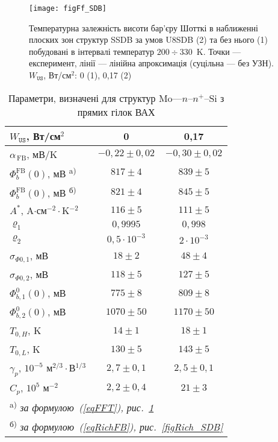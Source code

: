 \begin{figure}
\center
\texttt{[image: figFf\_SDB]}
\caption{\label{figFf_SDB}
Температурна залежність висоти бар'єру Шотткі в наближенні плоских зон
структур SSDB за умов U8SDB (2) та без нього (1) побудовані в інтервалі
температур $200\div330$~K.
Точки --- експеримент, лінії --- лінійна апроксимація (суцільна --- без УЗН).
$W_\mathtt{US}$,  Вт/см$^2$: 0 (1), 0,17 (2)
}%
\end{figure}


\begin{table}
\caption{Параметри, визначені для структур Mo---$n$--$n^+$--Si з прямих гілок ВАХ}
\label{tabSDBPar}
\centering
\begin{tabular}{|l|c|c|}
\hline
$W_\mathtt{US}$,  Вт/см$^2$ &0&0,17\\\hline
\hline
$\alpha_\mathrm{\,FB}$, мВ/K &$-0,22\pm0,02$&$-0,30\pm0,02$\\\hline
$\Phi_{b}^\mathrm{FB}(0)$, мВ \textsuperscript{ a)} &$817\pm4$ & $839\pm5$\\\hline
$\Phi_{b}^\mathrm{FB}(0)$, мВ \textsuperscript{ б)} &$821\pm4$ & $845\pm5$\\\hline
$A^*$, A$\cdot$см$^{-2}\cdot$K$^{-2}$ &$116\pm5$ & $111\pm5$\\\hline
$\varrho_1$ &$0,9995$ & $0,998$\\\hline
$\varrho_2$ &$0,5\cdot10^{-3}$ & $2\cdot10^{-3}$\\\hline
$\sigma_{\Phi0,1}$, мВ&$18\pm2$ & $48\pm4$\\\hline
$\sigma_{\Phi0,2}$, мВ&$118\pm5$ & $127\pm5$\\\hline
$\Phi_{b,1}^0(0)$, мВ&$775\pm8$ & $809\pm8$\\\hline
$\Phi_{b,2}^0(0)$, мВ&$1070\pm50$ & $1170\pm50$\\\hline
$T_{0,H}$, K&$14\pm1$&$18\pm1$\\\hline
$T_{0,L}$, K&$130\pm5$&$143\pm5$\\\hline
$\gamma_p$, $10^{-5}$ м$^{2/3}\cdot$В$^{1/3}$&$2,7\pm0,1$&$2,5\pm0,1$\\\hline
$C_p$, $10^{5}$ м$^{-2}$&$2,2\pm0,4$&$21\pm3$\\ \hline
\multicolumn{3}{l}{\textsuperscript{ a)} \emph{за формулою~(\ref{eqFFT}), рис.~\ref{figFf_SDB} }}  \\
\multicolumn{3}{l}{\textsuperscript{ б)} \emph{за формулою~(\ref{eqRichFB}), рис.~\ref{figRich_SDB} }} \\
\end{tabular}
\end{table}

